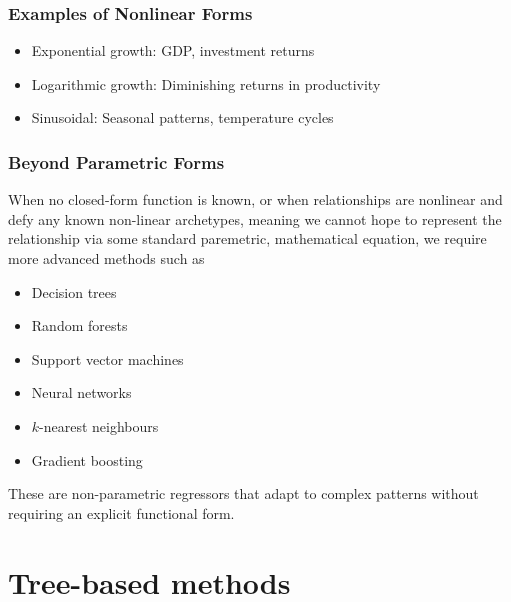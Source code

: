 \documentclass[9pt]{extarticle}
\begin{document}
\subsubsection*{Examples of Nonlinear Forms}

\begin{itemize}
    \item Exponential growth: GDP, investment returns
    \item Logarithmic growth: Diminishing returns in productivity
    \item Sinusoidal: Seasonal patterns, temperature cycles
\end{itemize}

\subsubsection*{Beyond Parametric Forms}

When no closed-form function is known, or when relationships are nonlinear 
and defy any known non-linear archetypes, meaning we cannot 
hope to represent the relationship via some standard paremetric, mathematical 
equation, we require more 
advanced methods such as
\begin{itemize}
    \item Decision trees
    \item Random forests
    \item Support vector machines
    \item Neural networks
    \item $k$-nearest neighbours
    \item Gradient boosting
\end{itemize}

These are non-parametric regressors that adapt to complex patterns 
without requiring an explicit functional form.

\section{Tree-based methods}
\end{document}

